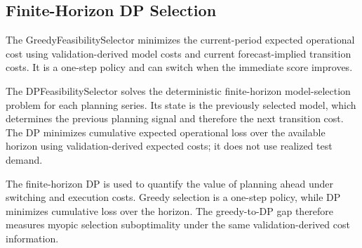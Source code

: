 \subsection{Finite-Horizon DP Selection}

The GreedyFeasibilitySelector minimizes the current-period expected operational cost using validation-derived model costs and current forecast-implied transition costs. It is a one-step policy and can switch when the immediate score improves.

The DPFeasibilitySelector solves the deterministic finite-horizon model-selection problem for each planning series. Its state is the previously selected model, which determines the previous planning signal and therefore the next transition cost. The DP minimizes cumulative expected operational loss over the available horizon using validation-derived expected costs; it does not use realized test demand.

The finite-horizon DP is used to quantify the value of planning ahead under switching and execution costs. Greedy selection is a one-step policy, while DP minimizes cumulative loss over the horizon. The greedy-to-DP gap therefore measures myopic selection suboptimality under the same validation-derived cost information.

\begin{center}
\end{center}

